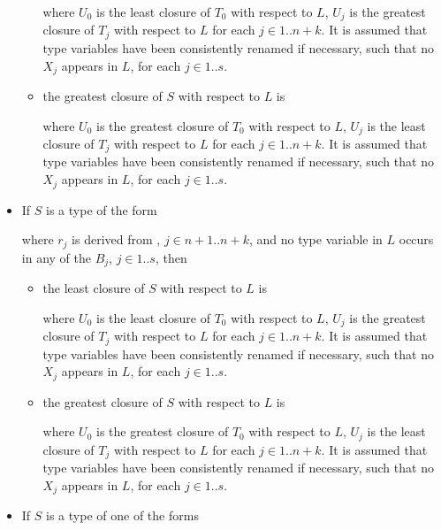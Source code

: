 \documentclass[makeidx]{article}
\begin{document}
\begin{itemize}
\begin{itemize}
    \noindent

    \noindent
    where
    $U_0$ is the least closure of $T_0$ with respect to $L$,
    $U_j$ is the greatest closure of $T_j$ with respect to $L$
    for each $j \in 1 .. n + k$.
    It is assumed that type variables have been consistently renamed
    if necessary,
    such that no $X_j$ appears in $L$,
    for each $j \in 1 .. s$.
  \item
    the greatest closure of $S$ with respect to $L$ is

    \noindent

    \noindent
    where $U_0$ is the greatest closure of $T_0$ with respect to $L$,
    $U_j$ is the least closure of $T_j$ with respect to $L$
    for each $j \in 1 .. n + k$.
    It is assumed that type variables have been consistently renamed
    if necessary,
    such that no $X_j$ appears in $L$,
    for each $j \in 1 .. s$.
  \end{itemize}
\item
  If $S$ is a type of the form

  \noindent

  \noindent
  where $r_j$ is derived from , $j \in n + 1 .. n + k$,
  and no type variable in $L$ occurs in any of the $B_j$, $j \in 1 .. s$,
  then
  \begin{itemize}
  \item
    the least closure of $S$ with respect to $L$ is

    \noindent

    \noindent
    where
    $U_0$ is the least closure of $T_0$ with respect to $L$,
    $U_j$ is the greatest closure of $T_j$ with respect to $L$
    for each $j \in 1 .. n + k$.
    It is assumed that type variables have been consistently renamed
    if necessary,
    such that no $X_j$ appears in $L$,
    for each $j \in 1 .. s$.
  \item
    the greatest closure of $S$ with respect to $L$ is

    \noindent

    \noindent
    where $U_0$ is the greatest closure of $T_0$ with respect to $L$,
    $U_j$ is the least closure of $T_j$ with respect to $L$
    for each $j \in 1 .. n + k$.
    It is assumed that type variables have been consistently renamed
    if necessary,
    such that no $X_j$ appears in $L$,
    for each $j \in 1 .. s$.
  \end{itemize}
\item
  If $S$ is a type of one of the forms


\end{itemize}
\end{document}
